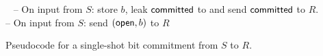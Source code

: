 \begin{bbox}[title={Functionality $\F_{\m{com}}(S, R)$}]
~
-- On input  from $S$: store $b$, leak $\mathsf{committed}$ to \A and send $\mathsf{committed}$ to $R$. \\
-- On input  from $S$: send $(\mathsf{open}, b)$ to $R$
%
%
%
%
\end{bbox}
\vspace{-0.5em}
\caption{Pseudocode for a single-shot bit commitment from $S$ to $R$.}
\label{fig:fcomideal}
